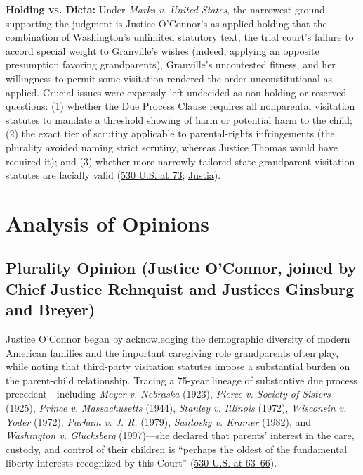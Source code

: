 \documentclass[12pt]{article}
\begin{document}
\textbf{Holding vs. Dicta:} Under \textit{Marks v. United States}, the narrowest ground supporting the judgment is Justice O'Connor's as-applied holding that the combination of Washington's unlimited statutory text, the trial court's failure to accord special weight to Granville's wishes (indeed, applying an opposite presumption favoring grandparents), Granville's uncontested fitness, and her willingness to permit some visitation rendered the order unconstitutional as applied. Crucial issues were expressly left undecided as non-holding or reserved questions: (1) whether the Due Process Clause requires all nonparental visitation statutes to mandate a threshold showing of harm or potential harm to the child; (2) the exact tier of scrutiny applicable to parental-rights infringements (the plurality avoided naming strict scrutiny, whereas Justice Thomas would have required it); and (3) whether more narrowly tailored state grandparent-visitation statutes are facially valid (\href{https://www.law.cornell.edu/supremecourt/text/99-138}{530 U.S. at 73}; \href{https://supreme.justia.com/cases/federal/us/530/57/}{Justia}).

\section{Analysis of Opinions}

\subsection{Plurality Opinion (Justice O'Connor, joined by Chief Justice Rehnquist and Justices Ginsburg and Breyer)}
Justice O'Connor began by acknowledging the demographic diversity of modern American families and the important caregiving role grandparents often play, while noting that third-party visitation statutes impose a substantial burden on the parent-child relationship. Tracing a 75-year lineage of substantive due process precedent---including \textit{Meyer v. Nebraska} (1923), \textit{Pierce v. Society of Sisters} (1925), \textit{Prince v. Massachusetts} (1944), \textit{Stanley v. Illinois} (1972), \textit{Wisconsin v. Yoder} (1972), \textit{Parham v. J. R.} (1979), \textit{Santosky v. Kramer} (1982), and \textit{Washington v. Glucksberg} (1997)---she declared that parents' interest in the care, custody, and control of their children is ``perhaps the oldest of the fundamental liberty interests recognized by this Court'' (\href{https://www.law.cornell.edu/supremecourt/text/99-138}{530 U.S. at 63--66}).
\end{document}
